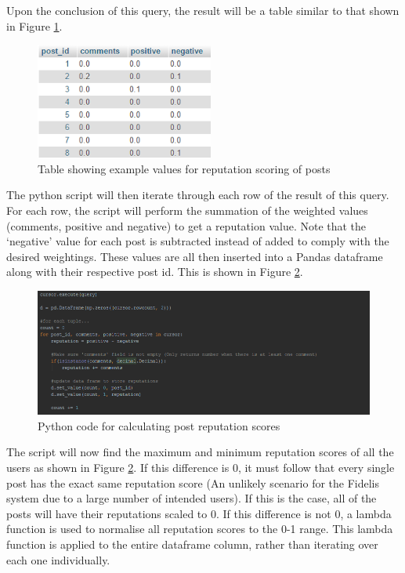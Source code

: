 Upon the conclusion of this query, the result will be a table similar to that shown in Figure \ref{fig:PostRepTable}.

\begin{figure}[H]
\centering
\includegraphics[height=1.5in]{Images/Implementation/PostRepTable}
\caption{Table showing example values for reputation scoring of posts}
\label{fig:PostRepTable}
\end{figure}

The python script will then iterate through each row of the result of this query. For each row, the script will perform the summation of the weighted values (comments, positive and negative) to get a reputation value. Note that the `negative' value for each post is subtracted instead of added to comply with the desired weightings. These values are all then inserted into a Pandas dataframe \cite{Pandas} along with their respective post id. This is shown in Figure \ref{fig:PostRepPython1}.

\begin{figure}[H]
\centering
\includegraphics[width=\linewidth]{Images/Implementation/PostRepPython1}
\caption{Python code for calculating post reputation scores}
\label{fig:PostRepPython1}
\end{figure}

The script will now find the maximum and minimum reputation scores of all the users as shown in Figure \ref{fig:PostRepPython1}. If this difference is 0, it must follow that every single post has the exact same reputation score (An unlikely scenario for the Fidelis system due to a large number of intended users). If this is the case, all of the posts will have their reputations scaled to 0. If this difference is not 0, a lambda function is used to normalise all reputation scores to the 0-1 range. This lambda function is applied to the entire dataframe column, rather than iterating over each one individually.

